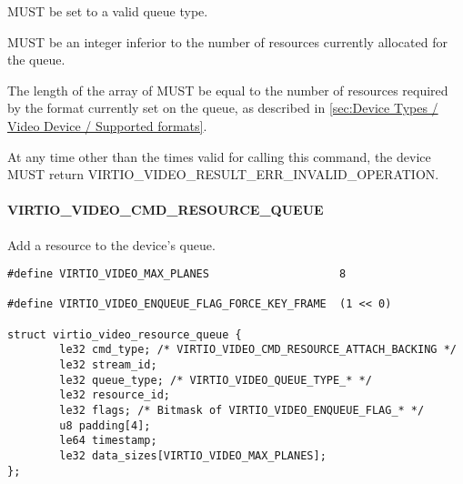  MUST be set to a valid queue type.

 MUST be an integer inferior to the number of
resources currently allocated for the queue.

The length of the  array of
 MUST be equal to the
number of resources required by the format currently set on the queue,
as described in
\ref{sec:Device Types / Video Device / Supported formats}.


At any time other than the times valid for calling this command, the
device MUST return VIRTIO\_VIDEO\_RESULT\_ERR\_INVALID\_OPERATION.

\paragraph{VIRTIO_VIDEO_CMD_RESOURCE_QUEUE}\label{sec:Device Types / Video Device / Device Operation / Device Operation: Resource Commands / VIRTIO_VIDEO_CMD_RESOURCE_QUEUE}

Add a resource to the device's queue.

\begin{lstlisting}
#define VIRTIO_VIDEO_MAX_PLANES                    8

#define VIRTIO_VIDEO_ENQUEUE_FLAG_FORCE_KEY_FRAME  (1 << 0)

struct virtio_video_resource_queue {
        le32 cmd_type; /* VIRTIO_VIDEO_CMD_RESOURCE_ATTACH_BACKING */
        le32 stream_id;
        le32 queue_type; /* VIRTIO_VIDEO_QUEUE_TYPE_* */
        le32 resource_id;
        le32 flags; /* Bitmask of VIRTIO_VIDEO_ENQUEUE_FLAG_* */
        u8 padding[4];
        le64 timestamp;
        le32 data_sizes[VIRTIO_VIDEO_MAX_PLANES];
};
\end{lstlisting}

